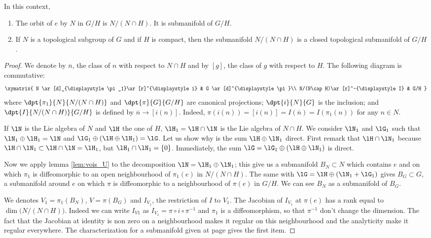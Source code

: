 \begin{proposition}			\label{prop:orbit_N_ss_var}
	In this context,
	\begin{enumerate}
		\item The orbit of $e$ by $N$ in $G/H$ is $N/(N\cap H)$. It is submanifold of $G/H$.
		\item If $N$ is a topological subgroup of $G$ and if $H$ is compact, then the submanifold $N/(N\cap H)$ is a closed topological submanifold of $G/H$.
	\end{enumerate}
\end{proposition}

\begin{proof}
We denote by $\overline{n}$, the class of $n$ with respect to $N\cap H$ and by $[g]$, the class of $g$ with respect to $H$.
The following diagram is commutative:
\begin{equation}\label{eq:dig_4.4}
 \xymatrix{
    N  \ar[d]_{\displaystyle\pi_1}\ar[r]^{\displaystyle i} &  G \ar[d]^{\displaystyle\pi}\\
    N/(N\cap H)\ar[r]^-{\displaystyle I} &       G/H
  }
\end{equation}
where $\dpt{\pi_1}{N}{N/(N\cap H)}$ and $\dpt{\pi}{G}{G/H}$ are canonical projections; $\dpt{i}{N}{G}$ is the inclusion; and $\dpt{I}{N/(N\cap H)}{G/H}$ is defined by $\overline{n}\to [i(n)]$. Indeed, $\pi(i(n))=[i(n)]=I( \overline{n} )=I(\pi_1(n))$ for any $n\in N$.

If $\lN$ is the Lie algebra of $N$ and $\lH$ the one of $H$, $\lH_1=\lH\cap\lN$ is the Lie algebra of $N\cap H$. We consider $\lN_1$ and  $\lG_1$ such that $\lN_1\oplus\lH_1=\lN$ and $\lG_1\oplus(\lH\oplus\lN_1)=\lG$. Let us show why is the sum $\lH\oplus\lN_1$ direct. First remark that $\lH\cap\lN_1$ because $\lH\cap\lN_1\subset\lH\cap\lN=\lH_1$, but $\lH_1\cap\lN_1=\{0\}$. Immediately, the sum $\lG=\lG_1\oplus(\lH\oplus\lN_1)$ is direct.

Now we apply lemma \ref{lem:vois_U} to the decomposition $\lN=\lH_1\oplus\lN_1$; this give us a submanifold $B_N\subset N$ which contains $e$ and on which $\pi_1$ is diffeomorphic to an open neighbourhood of $\pi_1(e)$ in $N/(N\cap H)$. The same with $\lG=\lH\oplus(\lN_1+\lG_1)$ gives $B_G\subset G$, a submanifold around $e$ on which $\pi$ is diffeomorphic to a neighbourhood of $\pi(e)$ in $G/H$. We can see $B_N$ as a submanifold of $B_G$.

We denotes $V_1=\pi_1(B_N)$, $V=\pi(B_G)$ and $I_{V_1}$, the restriction of $I$ to $V_1$. The Jacobian of $I_{V_1}$ at $\pi(e)$ has a rank equal to $\dim\big( N/(N\cap H) \big)$. Indeed we can write $I_{V1}$ as $I_{V_1}=\pi\circ i\circ\pi^{-1}$ and $\pi_1$ is a diffeomorphism, so that $\pi^{-1}$ don't change the dimension. The fact that the Jacobian at identity is non zero on a neighbourhood makes it regular on this neighbourhood and the analyticity make it regular everywhere. The characterization for a submanifold given at page \pageref{pg:caract_subvar} gives the first item.


\end{proof}
